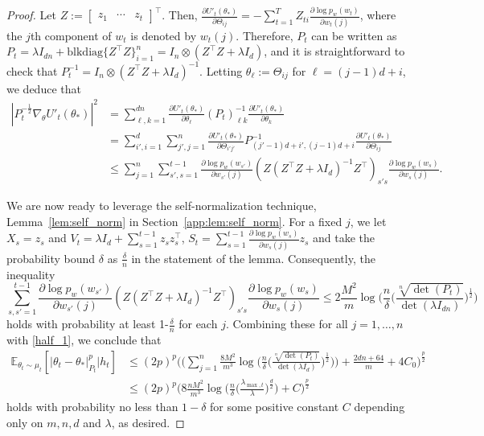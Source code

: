 \documentclass[11pt]{article}
\theoremstyle{plain}
\theoremstyle{definition}
\theoremstyle{remark}
\begin{document}
\begin{proof}
Let $Z:=\begin{bmatrix} z_1& \cdots &z_t \end{bmatrix}^\top$. 
Then,  $\frac{\partial U'_t(\theta_*)}{\partial \Theta_{ij}} =- \sum_{t=1}^{T} Z_{ti} \frac{\partial \log p_w(w_t)}{\partial w_t(j)}$, where the $j$th component of $w_t$ is denoted by $w_t(j)$. 
Therefore, $P_t$ can be written as $P_t= \lambda I_{dn}+\mathrm{blkdiag}\{Z^\top Z\}_{i=1}^n = I_n \otimes (Z^{\top}Z + \lambda I_d)$, and it is straightforward to check that $P_t^{-1} = I_n \otimes (Z^{\top}Z + \lambda I_d)^{-1} $.
Letting $\theta_\ell:= \Theta_{ij}$ for $\ell=(j-1)d+i$, 
we deduce that
\begin{equation*}
\begin{split}
    |P_t^{-\frac{1}{2}}\nabla_{\theta} U'_t(\theta_*)|^{2}&=\sum_{\ell,k=1}^{dn} \frac{\partial U'_t(\theta_*)}{\partial \theta_{\ell}} (P_t)^{-1}_{\ell k} \frac{\partial U'_t(\theta_*)}{\partial \theta_{k}}\\
    & = \sum_{i',i=1}^d\sum_{j',j=1}^{n} \frac{\partial U'_t(\theta_*)}{\partial {\Theta_{i'j'}}} P^{-1}_{(j'-1)d+i',(j-1)d+i} \frac{\partial U'_t(\theta_*)}{\partial {\Theta_{ij}}}\\
    &\leq \sum_{j=1}^{n}\sum_{s',s=1}^{t-1}\frac{\partial \log p_w(w_{s'})}{\partial w_{s'}(j)}(Z(Z^{\top}Z + \lambda I_d)^{-1}Z^{\top})_{s's}\frac{\partial \log p_w(w_s)}{\partial w_s(j)}.
\end{split}
\end{equation*}

We are now ready to leverage the self-normalization technique, Lemma~\ref{lem:self_norm} in Section~\ref{app:lem:self_norm}. 
For a fixed $j$, we let $X_s=z_s$ and $V_t =\lambda I_d +\sum_{s=1}^{t-1} z_s z_s^\top$, $S_t = \sum_{s=1}^{t-1}\frac{\partial\log p_w(w_{s})}{\partial w_{s}(j)}z_s$ and take the probability bound $\delta$ as $\frac{\delta}{n}$ in the statement of the lemma.
Consequently, the inequality
\begin{equation*}
    \sum_{s,s'=1}^{t-1}\frac{\partial \log p_w(w_{s'})}{\partial w_{s'}(j)}(Z(Z^{\top}Z + \lambda I_d)^{-1}Z^{\top})_{s's}\frac{\partial \log p_w(w_s)}{\partial w_s(j)} \leq 2\frac{M^2}{m}\log\bigg(\frac{n}{\delta}\bigg(\frac{\sqrt[n]{\det(P_t)}}{\det(\lambda I_{dn})}\bigg)^{\frac{1}{2}}\bigg)
\end{equation*}
holds with probability at least 1-$\frac{\delta}{n}$ for each $j$.
Combining these for all $j=1, \ldots, n$ with \eqref{half_1}, we conclude that
\begin{align*}
    \mathbb{E}_{\theta_t \sim \mu_t}[|\theta_t-\theta_*|^p_{P_t}|h_t]&\leq (2p)^p\bigg( \bigg(\sum_{j=1}^n \frac{8M^2}{m^3}\log\bigg(\frac{n}{\delta}\bigg(\frac{\sqrt[n]{\det(P_t)}}{\det(\lambda I_d)}\bigg)^{\frac{1}{2}}\bigg)\bigg) + \frac{2dn+64}{m}+ 4C_0\bigg)^{\frac{p}{2}}\\
    &\leq (2p)^p\bigg( 8\frac{nM^2}{m^3}\log \bigg(\frac{n}{\delta}\bigg(\frac{\lambda_{\max,t}}{\lambda}\bigg)^{\frac{d}{2}}\bigg) +C\bigg)^{\frac{p}{2}}
\end{align*}
holds with probability no less than $1-\delta$ for some positive constant $C$ depending only on $m,n,d$ and $\lambda$, as desired. 
\end{proof}
\end{document}
